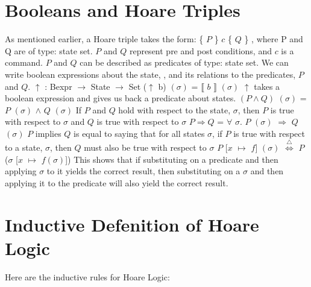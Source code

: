 \documentclass{lecturenotes}
\begin{document}
\section{Booleans and Hoare Triples}
As mentioned earlier, a Hoare triple takes the form: \{ $P$ \} $c$ \{ $Q$ \} , where P and Q are of type: state \rightarrow \; set.
$P$ and $Q$ represent pre and post conditions, and $c$ is a command. $P$ and $Q$ can be described as predicates of type: state \rightarrow \; set.
We can write boolean expressions about the state, \sigma \; , and its relations to the predicates, $P$ and $Q$. \newline
\newline
$\uparrow$ : Bexpr $\rightarrow$ State $\rightarrow$ Set \newline
($\uparrow$ b) $(\sigma)$ = $\llbracket$ $b$ $\rrbracket$ $(\sigma)$ \newline
\newline
$\uparrow$ takes a boolean expression and gives us back a predicate about states. \newline
\newline
$(P \wedge Q)$ $(\sigma)$ = $P$ $(\sigma)$ $\wedge$ $Q$ $(\sigma)$ \newline
If $P$ and $Q$ hold with respect to the state, $\sigma$, then $P$ is true with respect to $\sigma$ and $Q$ is true with respect to $\sigma$ \newline
\newline
\newpage
\noindent $P \Rightarrow Q$ = $\forall$ $\sigma$. $P$ $(\sigma)$ $\Rightarrow$ $Q$ $(\sigma)$ \newline
$P$ implies $Q$ is equal to saying that for all states $\sigma$, if $P$ is true with respect to a state, $\sigma$, then $Q$ must also be true with respect to $\sigma$ \newline
\newline
$P$ [$x$ $\mapsto$ $f$] $(\sigma)$ $\stackrel{\triangle}{\iff}$ $P$ ($\sigma$ [$x$ $\mapsto$ $f(\sigma)$]) \newline
This shows that if substituting on a predicate and then applying $\sigma$ to it yields the correct result, \newline
then substituting on a $\sigma$ and then applying it to the predicate will also yield the correct result. \newline

\section{Inductive Defenition of Hoare Logic}
Here are the inductive rules for Hoare Logic:
\begin{mathpar}
\end{mathpar}
\end{document}
